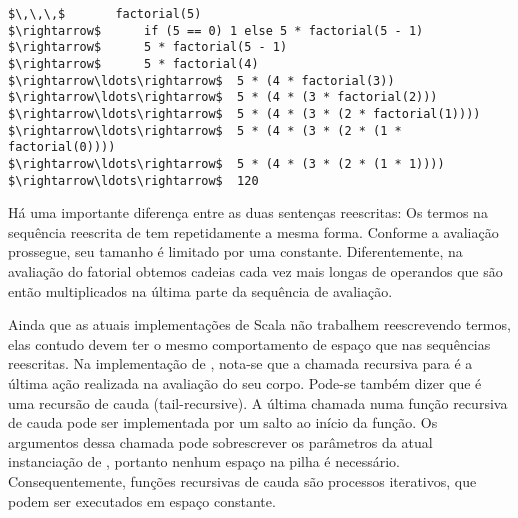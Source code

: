 \begin{lstlisting}
$\,\,\,$       factorial(5)
$\rightarrow$      if (5 == 0) 1 else 5 * factorial(5 - 1)
$\rightarrow$      5 * factorial(5 - 1)
$\rightarrow$      5 * factorial(4)
$\rightarrow\ldots\rightarrow$  5 * (4 * factorial(3))
$\rightarrow\ldots\rightarrow$  5 * (4 * (3 * factorial(2)))
$\rightarrow\ldots\rightarrow$  5 * (4 * (3 * (2 * factorial(1))))
$\rightarrow\ldots\rightarrow$  5 * (4 * (3 * (2 * (1 * factorial(0))))
$\rightarrow\ldots\rightarrow$  5 * (4 * (3 * (2 * (1 * 1))))
$\rightarrow\ldots\rightarrow$  120
\end{lstlisting}

H\'{a} uma importante diferen\c{c}a entre as duas senten\c{c}as reescritas:
Os termos na sequ\^{e}ncia reescrita de  tem repetidamente a
mesma forma. Conforme a avalia\c{c}\~{a}o prossegue, seu tamanho \'{e} limitado por
uma constante. Diferentemente, na avalia\c{c}\~{a}o do fatorial obtemos cadeias
cada vez mais longas de operandos que s\~{a}o ent\~{a}o multiplicados na \'{u}ltima
parte da sequ\^{e}ncia de avalia\c{c}\~{a}o. 


Ainda que as atuais implementa\c{c}\~{o}es de Scala n\~{a}o trabalhem reescrevendo
termos, elas contudo devem ter o mesmo comportamento de espa\c{c}o que nas
sequ\^{e}ncias reescritas. Na implementa\c{c}\~{a}o de , nota-se que  a 
chamada recursiva para  \'{e} a \'{u}ltima a\c{c}\~{a}o realizada na avalia\c{c}\~{a}o 
do seu corpo. Pode-se tamb\'{e}m dizer que  \'{e} uma recurs\~{a}o de cauda
(tail-recursive). A \'{u}ltima chamada numa fun\c{c}\~{a}o recursiva de cauda pode ser
implementada por um salto ao in\'{i}cio da fun\c{c}\~{a}o. Os argumentos dessa chamada 
pode sobrescrever os par\^{a}metros da atual instancia\c{c}\~{a}o de , portanto 
nenhum espa\c{c}o na pilha \'{e} necess\'{a}rio. Consequentemente, fun\c{c}\~{o}es recursivas de 
cauda s\~{a}o processos iterativos, que podem ser executados em espa\c{c}o constante.     

